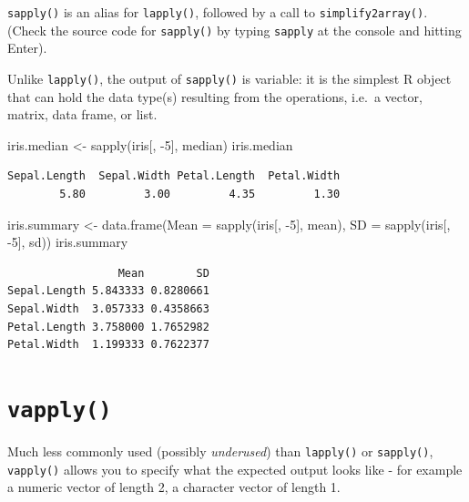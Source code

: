 \documentclass[
]{book}
\newenvironment{Shaded}{\begin{snugshade}}{\end{snugshade}}
\newcommand{\AttributeTok}[1]{\textcolor[rgb]{0.77,0.63,0.00}{#1}}
\newcommand{\DecValTok}[1]{\textcolor[rgb]{0.00,0.00,0.81}{#1}}
\newcommand{\FunctionTok}[1]{\textcolor[rgb]{0.00,0.00,0.00}{#1}}
\newcommand{\NormalTok}[1]{#1}
\newcommand{\OtherTok}[1]{\textcolor[rgb]{0.56,0.35,0.01}{#1}}
\newcommand{\SpecialCharTok}[1]{\textcolor[rgb]{0.00,0.00,0.00}{#1}}
\begin{document}
\texttt{sapply()} is an alias for \texttt{lapply()}, followed by a call to \texttt{simplify2array()}.\\
(Check the source code for \texttt{sapply()} by typing \texttt{sapply} at the console and hitting Enter).

\begin{rmdnote}
Unlike \texttt{lapply()}, the output of \texttt{sapply()} is variable:
it is the simplest R object that can hold the data type(s) resulting
from the operations, i.e.~a vector, matrix, data frame, or list.
\end{rmdnote}

\begin{Shaded}
\begin{Highlighting}[]
\NormalTok{iris.median }\OtherTok{\textless{}{-}} \FunctionTok{sapply}\NormalTok{(iris[, }\SpecialCharTok{{-}}\DecValTok{5}\NormalTok{], median)}
\NormalTok{iris.median}
\end{Highlighting}
\end{Shaded}

\begin{verbatim}
Sepal.Length  Sepal.Width Petal.Length  Petal.Width 
        5.80         3.00         4.35         1.30 
\end{verbatim}

\begin{Shaded}
\begin{Highlighting}[]
\NormalTok{iris.summary }\OtherTok{\textless{}{-}} \FunctionTok{data.frame}\NormalTok{(}\AttributeTok{Mean =} \FunctionTok{sapply}\NormalTok{(iris[, }\SpecialCharTok{{-}}\DecValTok{5}\NormalTok{], mean),}
                           \AttributeTok{SD =} \FunctionTok{sapply}\NormalTok{(iris[, }\SpecialCharTok{{-}}\DecValTok{5}\NormalTok{], sd))}
\NormalTok{iris.summary}
\end{Highlighting}
\end{Shaded}

\begin{verbatim}
                 Mean        SD
Sepal.Length 5.843333 0.8280661
Sepal.Width  3.057333 0.4358663
Petal.Length 3.758000 1.7652982
Petal.Width  1.199333 0.7622377
\end{verbatim}

\hypertarget{vapply}{%
\section{\texorpdfstring{\texttt{vapply()}}{vapply()}}\label{vapply}}

Much less commonly used (possibly \emph{underused}) than \texttt{lapply()} or \texttt{sapply()}, \texttt{vapply()} allows you to specify what the expected output looks like - for example a numeric vector of length 2, a character vector of length 1.
\end{document}
